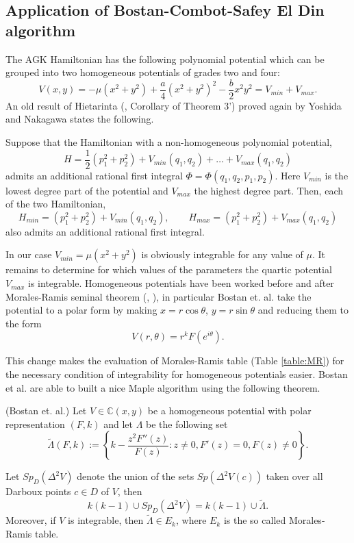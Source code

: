 \documentclass[final]{siamart0516}
\begin{document}
\subsection{Application  of Bostan-Combot-Safey El Din algorithm}
The AGK Hamiltonian has the following polynomial potential which can be grouped into two homogeneous
potentials of grades two and four: 
\begin{equation}
V(x,y)=- \mu(x^2+y^2) +\frac{a}{4}(x^2+y^2)^2 -\frac{b}{2}x^2y^2=V_{min}+V_{max}.
\end{equation}
An old result of Hietarinta (\cite{hietarinta}, Corollary  of Theorem 3') proved again by Yoshida \cite{yoshida} and Nakagawa \cite{Naka} states the following.
%
\begin{proposition}\label{H}
Suppose that the Hamiltonian with a non-homogeneous polynomial potential,
$$H=\frac{1}{2}(p_1^2+p_2^2) + V_{min}(q_1, q_2) +  \dots + V_{max}(q_1, q_2)$$
admits an additional rational first integral $\Phi = \Phi (q_1,q_2,p_1,p_2)$.
Here $V_{min}$ is the lowest degree part of the potential and $V_{max}$ the highest degree part. 
Then, each of the two Hamiltonian,
$$H_{min} = (p_1^2+p_2^2)+V_{min}(q_1,q_2), \qquad  H_{max} = (p_1^2+p_2^2)+V_{max} (q_1,q_2) $$
also admits an additional rational first integral.
\end{proposition}
 

In our case $V_{min}=\mu(x^2+y^2)$ is obviously integrable for any value of $\mu$. It remains to determine for which values of the parameters  the quartic potential $V_{max}$ is
integrable. Homogeneous potentials have been worked before and after Morales-Ramis seminal theorem (\cite{combot}, \cite{maria}), in particular
Bostan et. al.  \cite{combot} take the potential to a polar form by making $x=r\cos{\theta}$, $y=r\sin{\theta}$ and reducing them to the form
\begin{equation}
V(r,\theta)=r^kF(e^{i\theta}).
\end{equation}

This change makes the evaluation of Morales-Ramis table  (Table \ref{table:MR}) for the necessary condition of integrability for homogeneous potentials easier.  Bostan et al. are able
to built a nice Maple algorithm using the following theorem.
%
\begin{theorem}(Bostan et. al.\cite{combot})
Let $V \in \mathbb{C}(x,y)$ be a homogeneous potential with polar representation $(F, k)$ and let $\Lambda$ be the following set
$$\tilde{\Lambda}(F,k):=\left \{ k-\frac{z^2F''(z) }{F(z)} : z\ne 0, F'(z)=0, F(z)\ne 0 \right\}. $$

Let $Sp_D (\Delta^2V )$ denote the union of the sets $Sp(\Delta^2V (c))$ taken over all Darboux points $c \in D$ of $V$,  then
$${k(k-1)}\cup Sp_D(\Delta^2V) = {k(k-1)}\cup{\tilde\Lambda}. $$  Moreover, if $V$ is integrable, then 
$\tilde{\Lambda} \in E_k$,
where $E_k$ is the so called Morales-Ramis table. 
\end{theorem}
\end{document}
